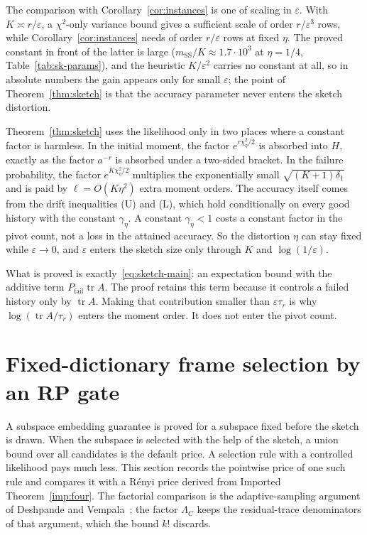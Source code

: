 \documentclass[11pt]{article}
\theoremstyle{definition}\newtheorem{definition}[theorem]{Definition}
\theoremstyle{remark}\newtheorem{remark}[theorem]{Remark}
\newcommand{\eps}{\varepsilon}
\newcommand{\tr}{\operatorname{tr}}
\newcommand{\1}{\mathbf 1}
\newcommand{\Pfail}{P_{\mathrm{fail}}}
\begin{document}
The comparison with Corollary~\ref{cor:instances} is one of scaling in
$\eps$. With $K\asymp r/\eps$, a $\chi^2$-only variance bound gives a sufficient scale of order
$r/\eps^3$ rows, while Corollary~\ref{cor:instances} needs of order
$r/\eps$ rows at fixed $\eta$. The proved constant in front of the latter
is large ($m_{\mathrm{SS}}/K\approx1.7\cdot10^3$ at $\eta=1/4$,
Table~\ref{tab:sk-params}), and the heuristic $K/\eps^2$ carries no
constant at all, so in absolute numbers the gain appears only for small
$\eps$; the point of Theorem~\ref{thm:sketch} is that the accuracy
parameter never enters the sketch distortion.

Theorem~\ref{thm:sketch} uses the likelihood only in two places where a
constant factor is harmless. In the initial moment, the factor
$e^{r\chi^2_\eta/2}$ is absorbed into $H$, exactly as the factor $a^{-r}$
is absorbed under a two-sided bracket. In the failure probability, the
factor $e^{K\chi^2_\eta/2}$ multiplies the exponentially small
$\sqrt{(K+1)\delta_1}$ and is paid by $\ell=O(K\eta^2)$ extra moment
orders. The accuracy itself comes from the drift inequalities (U) and
(L), which hold conditionally on every good history with the constant
$\gamma_\eta$. A constant $\gamma_\eta<1$ costs a constant factor in the
pivot count, not a loss in the attained accuracy. So the distortion
$\eta$ can stay fixed while $\eps\to0$, and $\eps$ enters the sketch
size only through $K$ and $\log(1/\eps)$.

What is proved is exactly~\eqref{eq:sketch-main}: an expectation bound
with the additive term $\Pfail\tr A$. The proof retains this term because
it controls a failed history only by $\tr A$. Making that contribution
smaller than $\eps\tau_r$ is why $\log(\tr A/\tau_r)$ enters the moment order.
It does not enter the pivot count.
\section{Fixed-dictionary frame selection by an RP gate}\label{sec:gate}
A subspace embedding guarantee is proved for a subspace fixed before the
sketch is drawn. When the subspace is selected with the help of the
sketch, a union bound over all candidates is the default price. A
selection rule with a controlled likelihood pays much less. This section
records the pointwise price of one such rule and compares it with a
R\'enyi price derived from Imported Theorem~\ref{imp:four}. The factorial
comparison is the adaptive-sampling argument of Deshpande and
Vempala~\cite{DV}; the factor $\Lambda_C$ keeps the residual-trace
denominators of that argument, which the bound $k!$ discards.
\end{document}
